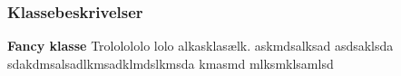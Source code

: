 \subsubsection{Klassebeskrivelser}


\textbf{Fancy klasse}
Trololololo lolo alkasklasælk. 
askmdsalksad asdsaklsda\\
sdakdmsalsadlkmsadklmdslkmsda kmasmd mlksmklsamlsd